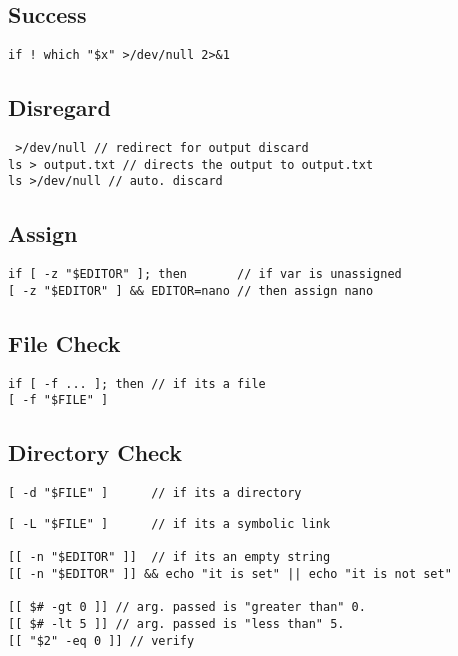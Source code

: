 \subsection{Success}

\begin{verbatim}
if ! which "$x" >/dev/null 2>&1
\end{verbatim}

\subsection{Disregard}

\begin{verbatim}
 >/dev/null // redirect for output discard
ls > output.txt // directs the output to output.txt
ls >/dev/null // auto. discard
\end{verbatim}

\subsection{Assign}

\begin{verbatim}
if [ -z "$EDITOR" ]; then       // if var is unassigned
[ -z "$EDITOR" ] && EDITOR=nano // then assign nano
\end{verbatim}

\subsection{File Check}

\begin{verbatim}
if [ -f ... ]; then // if its a file
[ -f "$FILE" ] 
\end{verbatim}

\subsection{Directory Check}

\begin{verbatim}
[ -d "$FILE" ]      // if its a directory
\end{verbatim}

\begin{verbatim}
[ -L "$FILE" ]      // if its a symbolic link 

[[ -n "$EDITOR" ]]  // if its an empty string
[[ -n "$EDITOR" ]] && echo "it is set" || echo "it is not set"

[[ $# -gt 0 ]] // arg. passed is "greater than" 0.
[[ $# -lt 5 ]] // arg. passed is "less than" 5.
[[ "$2" -eq 0 ]] // verify 
\end{verbatim}

